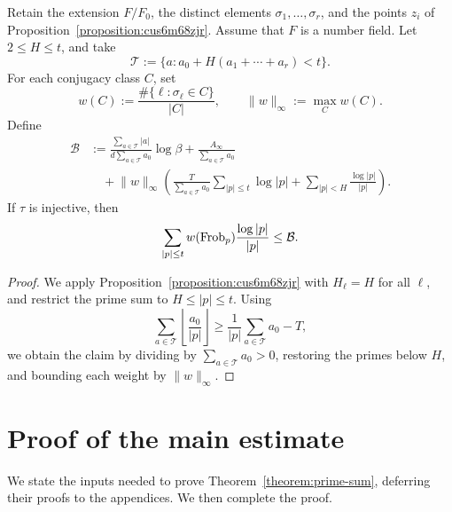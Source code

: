 \documentclass[reqno]{amsart} 
\begin{document}
\begin{corollary}\label{corollary:height-prime-comparison}
  Retain the extension $F/F_0$, the distinct elements $\sigma_1, \dotsc, \sigma_r$, and the points $z_i$ of Proposition~\ref{proposition:cus6m68zjr}.  Assume that $F$ is a number field.  Let $2 \leq H \leq t$, and take
  \begin{equation*}
    \mathcal{T} := \{a : a_0 + H(a_1 + \dotsb + a_r) < t\}.
  \end{equation*}
  For each conjugacy class $C$, set
  \begin{equation*}
    w(C) := \frac{\#\{\ell : \sigma_\ell \in C\}}{|C|},
    \qquad \lVert w \rVert_\infty := \max_C w(C).
  \end{equation*}
  Define
  \begin{equation}\label{eq:comparison-bound}
    \begin{split}
      \mathcal{B}
      &:= \frac{\sum_{a \in \mathcal{T}} |a|}{d\sum_{a \in \mathcal{T}} a_0}\log\beta
      + \frac{A_\infty}{\sum_{a \in \mathcal{T}} a_0} \\
      &\quad + \lVert w \rVert_\infty\left(
      \frac{T}{\sum_{a \in \mathcal{T}} a_0}\sum_{|p| \leq t}\log|p|
        + \sum_{|p| < H}\frac{\log|p|}{|p|}\right).
    \end{split}
  \end{equation}
  If $\tau$ is injective, then
  \begin{equation}\label{eq:weighted-prime-bound}
    \sum_{|p| \leq t} w(\operatorname{Frob}_p)\frac{\log|p|}{|p|} \leq \mathcal{B}.
  \end{equation}
\end{corollary}
\begin{proof}
  We apply Proposition~\ref{proposition:cus6m68zjr} with $H_\ell = H$ for all $\ell$, and restrict the prime sum to $H \leq |p| \leq t$.  Using
  \begin{equation*}
    \sum_{a \in \mathcal{T}}\left\lfloor\frac{a_0}{|p|}\right\rfloor
    \geq \frac{1}{|p|}\sum_{a \in \mathcal{T}} a_0 - T,
  \end{equation*}
  we obtain the claim by dividing by $\sum_{a \in \mathcal{T}} a_0 > 0$, restoring the primes below $H$, and bounding each weight by $\lVert w \rVert_\infty$.
\end{proof}

\section{Proof of the main estimate}\label{section:inputs}
We state the inputs needed to prove Theorem~\ref{theorem:prime-sum}, deferring their proofs to the appendices.  We then complete the proof.
\end{document}
